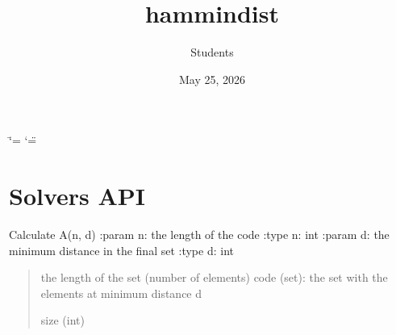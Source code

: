 \documentclass[letterpaper,10pt,english]{sphinxmanual}
\title{hammindist}
\date{May 25, 2026}
\author{Students}
\begin{document}
\ifdefined\shorthandoff
  \ifnum\catcode`\=\string=\active\shorthandoff{=}\fi
  \ifnum\catcode`\"=\active{}\fi
\fi

\pagestyle{empty}
\sphinxmaketitle
\pagestyle{plain}
\sphinxtableofcontents
\pagestyle{normal}
\label{\detokenize{index::doc}}



\chapter{Solvers API}
\label{\detokenize{index:module-hammindist.functions}}\label{\detokenize{index:solvers-api}}

\begin{fulllineitems}
\label{\detokenize{index:hammindist.functions.A}}
\pysigstartsignatures
\pysiglinewithargsret
{}
{\sphinxparamcomma {}\sphinxparamcomma {}}
{}
\pysigstopsignatures
\sphinxAtStartPar
Calculate A(n, d)
:param n: the length of the code
:type n: int
:param d: the minimum distance in the final set
:type d: int
\begin{quote}\begin{description}
\sphinxAtStartPar
the length of the set (number of elements)
code (set): the set with the elements at minimum distance d

\sphinxAtStartPar
size (int)

\end{description}\end{quote}

\end{fulllineitems}

\end{document}
